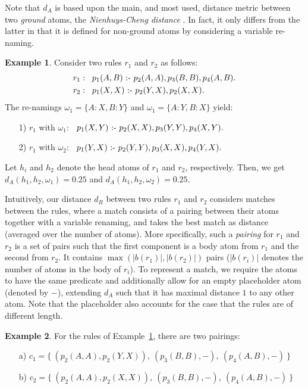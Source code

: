 \documentclass[letterpaper]{article} \usepackage{aaai20}  \usepackage{times}  \usepackage{helvet} \usepackage{courier}  \usepackage[hyphens]{url}  \usepackage{graphicx} \urlstyle{rm} \def\UrlFont{\rm}  \usepackage{graphicx}  \frenchspacing  \setlength{\pdfpagewidth}{8.5in}  \setlength{\pdfpageheight}{11in}  \usepackage{amsthm}
\theoremstyle{definition}
\newtheorem{example}{Example}[section]
\newcommand{\ass}{\text{ :- }}
\begin{document}
Note that $d_A$ is based upon the main, and most used, distance metric between two \emph{ground} atoms, the \emph{Nienhuys-Cheng distance} \cite{Nienhuys_Cheng_distance}. In fact, it only differs from the latter in that it is defined for non-ground atoms by considering a variable re-naming.


\begin{example}\label{ex:1}
Consider two rules $r_1$ and $r_2$ as follows:
\begin{align*}
r_1: &\hspace{0.3cm} p_1(A,B) \ass p_2(A,A), p_3(B,B), p_4(A,B). \\
r_2: &\hspace{0.3cm} p_1(X,X) \ass p_2(Y,X), p_2(X,X).
\end{align*}
The re-namings 
$\omega_1=\{A:X,B:Y\}$ and $\omega_1=\{A:Y,B:X\}$ yield:
\begin{itemize}
\item[1)] $r_1$ with $\omega_1$: $\hspace{0.2cm} p_1(X,Y) \ass p_2(X,X), p_3(Y,Y), p_4(X,Y).$
\item[2)] $r_1$ with $\omega_2$: $\hspace{0.2cm} p_1(Y,X) \ass p_2(Y,Y), p_3(X,X), p_4(Y,X).$
\end{itemize}
Let $h_i$ and $h_2$ denote the head atoms of $r_1$ and $r_2$, respectively. Then, we get 
$d_A(h_1,h_2,\omega_1)=0.25$ and $d_A(h_1,h_2,\omega_2)=0.25$.
\end{example}


Intuitively, our distance $d_R$ between two rules $r_1$ and $r_2$ considers matches between the rules, where a match consists of a pairing between their atoms together with a variable renaming, and takes the best match as distance (averaged over the number of atoms).
More specifically, such a \emph{pairing} for $r_1$ and $r_2$ is a set of pairs such that the first component is a body atom from $r_1$ and the second from $r_2$. It contains $\max(|b(r_1)|,|b(r_2)|)$ pairs ($|b(r_i)|$ denotes the number of atoms in the body of $r_i$). 
To represent a match, we require the atoms to have the same predicate and additionally allow for an empty placeholder atom (denoted by $-$), extending $d_A$ such that it has maximal distance $1$ to any other atom. Note that the placeholder also accounts for the case that the rules are of different length. 


\begin{example}
For the rules of Example~\ref{ex:1}, there are two pairings: 
\begin{itemize}
\item[a)]$c_1=\{~(p_2(A,A),p_2(Y,X)),~(p_3(B,B),-),~(p_4(A,B),-)~\}$   
\item[b)]$c_2=\{~(p_2(A,A),p_2(X,X)),~(p_3(B,B),-),~(p_4(A,B),-)~\}$
\end{itemize}
\end{example}
\end{document}
